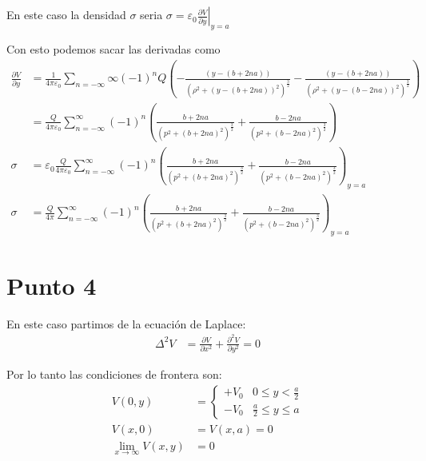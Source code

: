 \documentclass{report}
\begin{document}
\section{}

En este caso la densidad $\sigma$ seria $\sigma = \left.\varepsilon_0 \frac{\partial V}{\partial y}\right|_{y=a}$

Con esto podemos sacar las derivadas como
\begin{align*}
	\frac{\partial V}{\partial y} &= \frac{1}{4\pi \varepsilon_0 } \sum_{n= -\infty}{\infty}\left( -1 \right)^n Q \left( - \frac{\left( y - \left( b + 2na \right) \right)}{\left( \rho^2 + \left( y - \left( b + 2na \right) \right)^2 \right)^{\frac{3}{2}}} - \frac{\left( y - \left( b + 2na \right) \right)}{\left( \rho^2 + \left( y - \left( b - 2na \right) \right)^2 \right)^{\frac{3}{2}}} \right)\\
	&= \frac{Q}{4\pi \varepsilon_0 } \sum_{n = -\infty}^{\infty} \left( -1 \right)^n \left( \frac{b + 2na}{\left( p^2 + \left( b + 2na \right)^2 \right)^{\frac{3}{2}}} + \frac{b - 2na}{\left( p^2 + \left( b - 2na \right)^2 \right)^{\frac{3}{2}}} \right)\\
	\sigma &= \varepsilon_0 \frac{Q}{4\pi \varepsilon_0 } \sum_{n = -\infty}^{\infty} \left( -1 \right)^n \left( \frac{b + 2na}{\left( p^2 + \left( b + 2na \right)^2 \right)^{\frac{3}{2}}} + \frac{b - 2na}{\left( p^2 + \left( b - 2na \right)^2 \right)^{\frac{3}{2}}} \right)_{y = a}\\
	\sigma &= \frac{Q}{4\pi} \sum_{n = -\infty}^{\infty} \left( -1 \right)^n \left( \frac{b + 2na}{\left( p^2 + \left( b + 2na \right)^2 \right)^{\frac{3}{2}}} + \frac{b - 2na}{\left( p^2 + \left( b - 2na \right)^2 \right)^{\frac{3}{2}}} \right)_{y = a}
\end{align*}

\chapter{Punto 4}

En este caso partimos de la ecuación de Laplace:
\begin{align*}
	\Delta^2 V &= \frac{\partial V}{\partial x^2} + \frac{\partial^2 V}{\partial y^2} = 0
\end{align*}

Por lo tanto las condiciones de frontera son:
\begin{align*}
	V \left( 0, y \right) &= 
	\begin{cases}
		+ V_0 & 0 \le y < \frac{a}{2}\\
		- V_0 & \frac{a}{2} \le y \le a
	\end{cases}\\
	V(x, 0) &= V(x, a) = 0\\
	\lim_{x\to\infty} V(x, y) &= 0
\end{align*}
\end{document}

